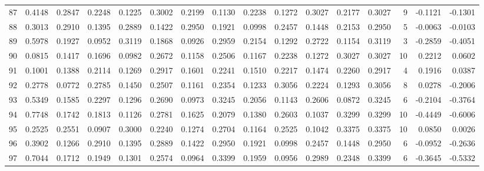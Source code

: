 \begin{tabular}{lrrrrrrrrrrrrrrr}
87  &      0.4148 &  0.2847 &  0.2248 &  0.1225 &  0.3002 &  0.2199 &  0.1130 &  0.2238 &  0.1272 &  0.3027 &   0.2177 &     0.3027 &      9 &                   -0.1121 &                    -0.1301 \\
88  &      0.3013 &  0.2910 &  0.1395 &  0.2889 &  0.1422 &  0.2950 &  0.1921 &  0.0998 &  0.2457 &  0.1448 &   0.2153 &     0.2950 &      5 &                   -0.0063 &                    -0.0103 \\
89  &      0.5978 &  0.1927 &  0.0952 &  0.3119 &  0.1868 &  0.0926 &  0.2959 &  0.2154 &  0.1292 &  0.2722 &   0.1154 &     0.3119 &      3 &                   -0.2859 &                    -0.4051 \\
90  &      0.0815 &  0.1417 &  0.1696 &  0.0982 &  0.2672 &  0.1158 &  0.2506 &  0.1167 &  0.2238 &  0.1272 &   0.3027 &     0.3027 &     10 &                    0.2212 &                     0.0602 \\
91  &      0.1001 &  0.1388 &  0.2114 &  0.1269 &  0.2917 &  0.1601 &  0.2241 &  0.1510 &  0.2217 &  0.1474 &   0.2260 &     0.2917 &      4 &                    0.1916 &                     0.0387 \\
92  &      0.2778 &  0.0772 &  0.2785 &  0.1450 &  0.2507 &  0.1161 &  0.2354 &  0.1233 &  0.3056 &  0.2224 &   0.1293 &     0.3056 &      8 &                    0.0278 &                    -0.2006 \\
93  &      0.5349 &  0.1585 &  0.2297 &  0.1296 &  0.2690 &  0.0973 &  0.3245 &  0.2056 &  0.1143 &  0.2606 &   0.0872 &     0.3245 &      6 &                   -0.2104 &                    -0.3764 \\
94  &      0.7748 &  0.1742 &  0.1813 &  0.1126 &  0.2781 &  0.1625 &  0.2079 &  0.1380 &  0.2603 &  0.1037 &   0.3299 &     0.3299 &     10 &                   -0.4449 &                    -0.6006 \\
95  &      0.2525 &  0.2551 &  0.0907 &  0.3000 &  0.2240 &  0.1274 &  0.2704 &  0.1164 &  0.2525 &  0.1042 &   0.3375 &     0.3375 &     10 &                    0.0850 &                     0.0026 \\
96  &      0.3902 &  0.1266 &  0.2910 &  0.1395 &  0.2889 &  0.1422 &  0.2950 &  0.1921 &  0.0998 &  0.2457 &   0.1448 &     0.2950 &      6 &                   -0.0952 &                    -0.2636 \\
97  &      0.7044 &  0.1712 &  0.1949 &  0.1301 &  0.2574 &  0.0964 &  0.3399 &  0.1959 &  0.0956 &  0.2989 &   0.2348 &     0.3399 &      6 &                   -0.3645 &                    -0.5332 \\

\end{tabular}
